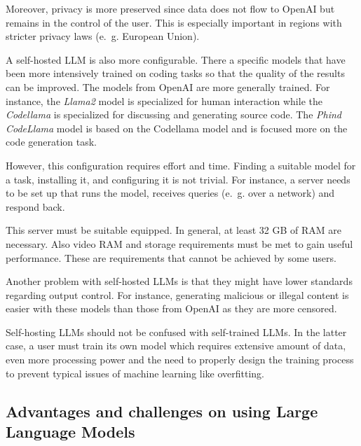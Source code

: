 Moreover, privacy is more preserved since data does not flow to OpenAI but remains in the control of the user. This is especially important in regions with stricter privacy laws (e.~g. European Union).

A self-hosted \ac{LLM} is also more configurable. There a specific models that have been more intensively trained on coding tasks so that the quality of the results can be improved. The models from OpenAI are more generally trained.  For instance, the \textit{Llama2} model is specialized for human interaction while the \textit{Codellama} is specialized for discussing and generating source code. The \textit{Phind CodeLlama} model is based on the Codellama model and is focused more on the code generation task. 

However, this configuration requires effort and time. Finding a suitable model for a task, installing it, and configuring it is not trivial. For instance, a server needs to be set up that  runs the model, receives queries (e.~g. over a network) and respond back. 

This server must be suitable equipped. In general, at least 32 GB of RAM are necessary. Also video RAM and storage requirements must be met to gain useful performance. These are requirements that cannot be achieved by some users. 




Another problem with self-hosted \acp{LLM} is that they might have lower standards regarding output control. For instance, generating malicious or illegal content is easier with these models than those from OpenAI as they are more censored. 


Self-hosting \acp{LLM} should not be confused with self-trained \acp{LLM}. In the latter case, a user must train its own model which requires extensive amount of data, even more processing power and the need to properly design the training process to prevent typical issues of machine learning like overfitting.

\subsection{Advantages and challenges on using Large Language Models}\label{sec:llm_challenges}

